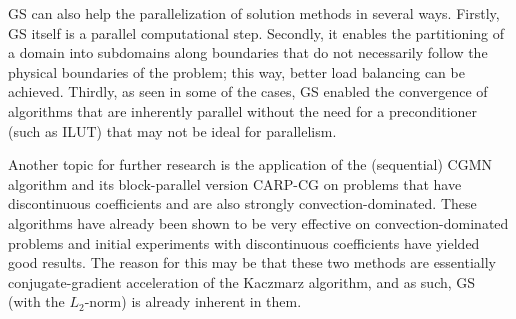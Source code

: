 \documentclass[12pt,a4paper]{article}
\newcounter{i}
\begin{document}
GS can also help the parallelization of solution methods in 
several ways.  Firstly, GS itself is a parallel computational 
step.  Secondly, it enables the partitioning of a domain into 
subdomains along boundaries that do not necessarily follow the 
physical boundaries of the problem; this way, better load 
balancing can be achieved.  Thirdly, as seen in some of the 
cases, GS enabled the convergence of algorithms that are 
inherently parallel without the need for a preconditioner 
(such as ILUT) that may not be ideal for parallelism.

Another topic for further research is the application of the
(sequential) CGMN algorithm \cite{Bjorck79,Gordon08} and its
block-parallel version CARP-CG \cite{Gordon08a} on problems 
that have discontinuous coefficients and are also strongly 
convection-dominated.  These algorithms have already been 
shown to be very effective on convection-dominated problems 
and initial experiments with discontinuous coefficients have 
yielded good results.  The reason for this may be that these 
two methods are essentially conjugate-gradient acceleration
of the Kaczmarz algorithm, and as such, GS (with the 
$L_2$-norm) is already inherent in them.  




\end{document}
